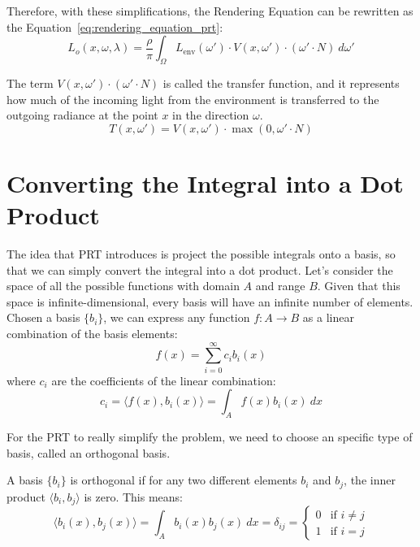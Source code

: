Therefore, with these simplifications, the Rendering Equation can be rewritten as the Equation~\eqref{eq:rendering_equation_prt}:
\begin{equation}
    L_o(x, \omega, \lambda) = \frac{\rho}{\pi} \int_{\Omega} L_{\text{env}}(\omega')\cdot V(x, \omega') \cdot (\omega' \cdot N)\ d\omega'
    \label{eq:rendering_equation_prt}
\end{equation}

The term $V(x, \omega')\cdot (\omega' \cdot N)$ is called the transfer function, and it represents how much of the incoming light from the environment is transferred to the outgoing radiance at the point $x$ in the direction $\omega$.
\begin{equation*}
    T(x, \omega') = V(x, \omega')\cdot \max(0,\omega' \cdot N)
\end{equation*}

\section{Converting the Integral into a Dot Product}

The idea that PRT introduces is project the possible integrals onto a basis, so that we can simply convert the integral into a dot product. Let's consider the space of all the possible functions with domain $A$ and range $B$. Given that this space is infinite-dimensional, every basis will have an infinite number of elements. Chosen a basis $\{b_i\}$, we can express any function $f: A \to B$ as a linear combination of the basis elements:
\begin{equation*}
    f(x) = \sum_{i=0}^{\infty} c_i b_i(x)
\end{equation*}
where $c_i$ are the coefficients of the linear combination:
\begin{equation*}
    c_i = \langle f(x), b_i(x) \rangle = \int_{A} f(x) b_i(x) \ dx
\end{equation*}

For the PRT to really simplify the problem, we need to choose an specific type of basis, called an orthogonal basis.
\begin{definicion}
    A basis $\{b_i\}$ is orthogonal if for any two different elements $b_i$ and $b_j$, the inner product $\langle b_i, b_j \rangle$ is zero. This means:
\begin{equation*}
    \langle b_i(x), b_j(x) \rangle = \int_{A} b_i(x) b_j(x) \ dx = \delta_{ij} = \begin{cases}
        0 & \text{if } i \neq j \\
        1 & \text{if } i = j
    \end{cases}
\end{equation*}
\end{definicion}

